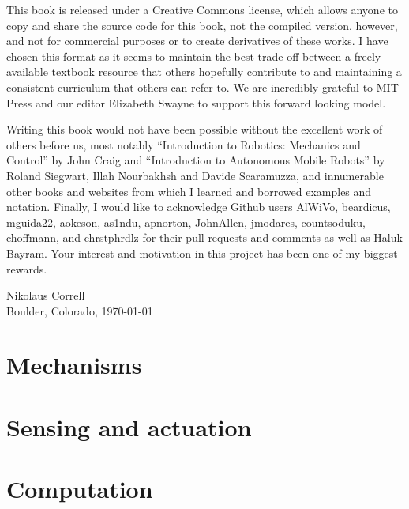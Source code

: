 \documentclass[paper=7in:9in,pagesize=pdftex,11pt,twoside,openright]{scrbook}
\begin{document}
This book is released under a Creative Commons license, which allows anyone to copy and share the source code for this book, not the compiled version, however, and not for commercial purposes or to create derivatives of these works. I have chosen this format as it seems to maintain the best trade-off between a freely available textbook resource that others hopefully contribute to and maintaining a consistent curriculum that others can refer to. We are incredibly grateful to MIT Press and our editor Elizabeth Swayne to support this forward looking model.

Writing this book would not have been possible without the excellent work of others before us, most notably ``Introduction to Robotics: Mechanics and Control'' by John Craig and ``Introduction to Autonomous Mobile Robots'' by Roland Siegwart, Illah Nourbakhsh and Davide Scaramuzza, and innumerable other books and websites from which I learned and borrowed examples and notation. Finally, I would like to acknowledge Github users AlWiVo, beardicus, mguida22, aokeson, as1ndu, apnorton, JohnAllen, jmodares, countsoduku, choffmann, and chrstphrdlz for their pull requests and comments as well as Haluk Bayram. Your interest and motivation in this project has been one of my biggest rewards.

\begin{flushright}
Nikolaus Correll\\
Boulder, Colorado, \today
\end{flushright}



\part{Mechanisms}





\part{Sensing and actuation}




\part{Computation}










\appendix













\printindex
\end{document}
